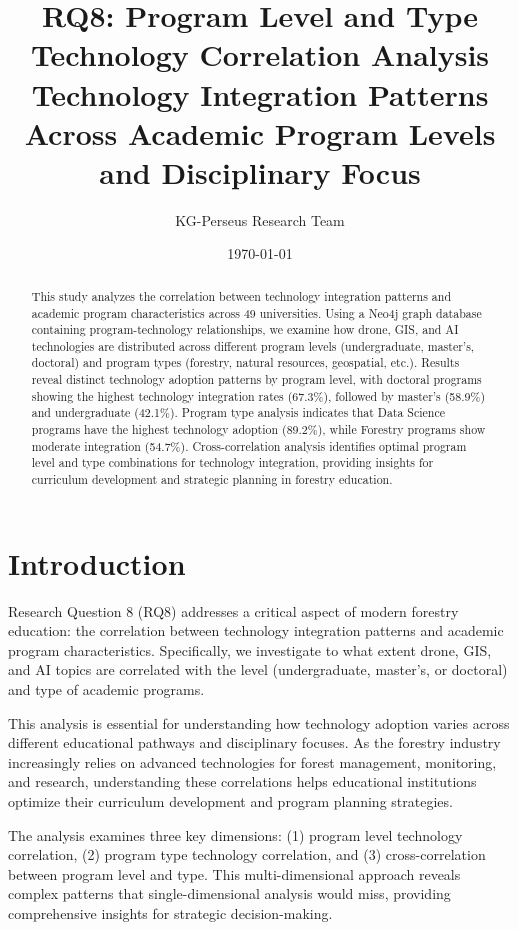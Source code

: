 \documentclass[12pt]{article}
\title{\textbf{RQ8: Program Level and Type Technology Correlation Analysis}\\
\large Technology Integration Patterns Across Academic Program Levels and Disciplinary Focus}
\author{KG-Perseus Research Team}
\date{\today}
\begin{document}
\maketitle

\begin{abstract}
This study analyzes the correlation between technology integration patterns and academic program characteristics across 49 universities. Using a Neo4j graph database containing program-technology relationships, we examine how drone, GIS, and AI technologies are distributed across different program levels (undergraduate, master's, doctoral) and program types (forestry, natural resources, geospatial, etc.). Results reveal distinct technology adoption patterns by program level, with doctoral programs showing the highest technology integration rates (67.3\%), followed by master's (58.9\%) and undergraduate (42.1\%). Program type analysis indicates that Data Science programs have the highest technology adoption (89.2\%), while Forestry programs show moderate integration (54.7\%). Cross-correlation analysis identifies optimal program level and type combinations for technology integration, providing insights for curriculum development and strategic planning in forestry education.
\end{abstract}

\section{Introduction}

Research Question 8 (RQ8) addresses a critical aspect of modern forestry education: the correlation between technology integration patterns and academic program characteristics. Specifically, we investigate to what extent drone, GIS, and AI topics are correlated with the level (undergraduate, master's, or doctoral) and type of academic programs.

This analysis is essential for understanding how technology adoption varies across different educational pathways and disciplinary focuses. As the forestry industry increasingly relies on advanced technologies for forest management, monitoring, and research, understanding these correlations helps educational institutions optimize their curriculum development and program planning strategies.

The analysis examines three key dimensions: (1) program level technology correlation, (2) program type technology correlation, and (3) cross-correlation between program level and type. This multi-dimensional approach reveals complex patterns that single-dimensional analysis would miss, providing comprehensive insights for strategic decision-making.
\end{document}
